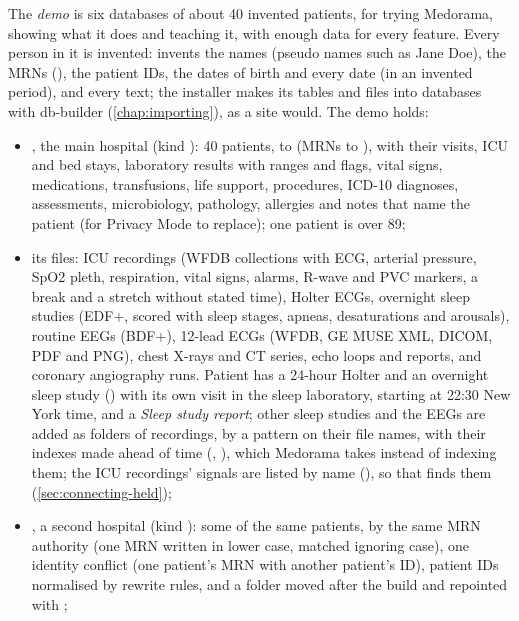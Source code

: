 The \emph{demo} is six databases of about 40 invented patients, for trying Medorama, showing
what it does and teaching it, with enough data for every feature. Every person in it is
invented:  invents the names (pseudo names such as Jane Doe), the
MRNs (), the patient IDs, the dates of birth and every date (in an invented
period), and every text; the installer makes its tables and files into databases with db-builder
(\cref{chap:importing}), as a site would. The demo holds:
\begin{itemize}
\item {}, the main hospital (kind ): 40 patients,  to
   (MRNs  to ), with their visits, ICU and bed
  stays, laboratory results with ranges and flags, vital signs, medications, transfusions, life
  support, procedures, ICD-10 diagnoses, assessments, microbiology, pathology, allergies and
  notes that name the patient (for Privacy Mode to replace); one patient is over 89;
\item its files: ICU recordings (WFDB collections with ECG, arterial pressure, SpO2 pleth,
  respiration, vital signs, alarms, R-wave and PVC markers, a break and a stretch without stated
  time), Holter ECGs, overnight sleep studies (EDF+, scored with sleep stages, apneas,
  desaturations and arousals), routine EEGs (BDF+), 12-lead ECGs (WFDB, GE MUSE XML, DICOM, PDF
  and PNG), chest X-rays and CT series, echo loops and reports, and coronary angiography runs.
  Patient  has a 24-hour Holter and an overnight sleep study
  () with its own visit in the sleep laboratory, starting
  at 22:30 New York time, and a \emph{Sleep study report}; other sleep studies and the EEGs are
  added as folders of recordings, by a pattern on their file names, with their indexes made
  ahead of time (, ), which Medorama takes instead of
  indexing them; the ICU recordings' signals are listed by name (), so
  that  finds them (\cref{sec:connecting-held});
\item {}, a second hospital (kind ): some of the same patients, by the
  same MRN authority  (one MRN written in lower case, matched ignoring case), one
  identity conflict (one patient's MRN with another patient's ID), patient IDs normalised by
  rewrite rules, and a folder moved after the build and repointed with ;

\end{itemize}
